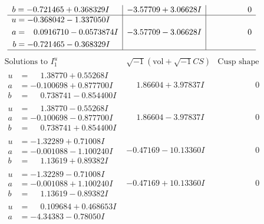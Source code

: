 \documentclass[1p]{elsarticle_modified}
\theoremstyle{definition}
\newcommand{\I}{\sqrt{-1}}
\begin{document}
$$\begin{array}{c|c|c}
\begin{aligned}
b &= -0.721465 + 0.368329 I\end{aligned}
 & -3.57709 + 3.06628 I & \phantom{-0.000000 } 0 \\ \hline\begin{aligned}
u &= -0.368042 - 1.337050 I \\
a &= \phantom{-}0.0916710 - 0.0573874 I \\
b &= -0.721465 - 0.368329 I\end{aligned}
 & -3.57709 - 3.06628 I & \phantom{-0.000000 } 0\\
 \hline 
 \end{array}$$\newpage$$\begin{array}{c|c|c}  
\text{Solutions to }I^u_{1}& \I (\text{vol} + \sqrt{-1}CS) & \text{Cusp shape}\\
 \hline 
\begin{aligned}
u &= \phantom{-}1.38770 + 0.55268 I \\
a &= -0.100698 + 0.877700 I \\
b &= \phantom{-}0.738741 - 0.854400 I\end{aligned}
 & \phantom{-}1.86604 + 3.97837 I & \phantom{-0.000000 } 0 \\ \hline\begin{aligned}
u &= \phantom{-}1.38770 - 0.55268 I \\
a &= -0.100698 - 0.877700 I \\
b &= \phantom{-}0.738741 + 0.854400 I\end{aligned}
 & \phantom{-}1.86604 - 3.97837 I & \phantom{-0.000000 } 0 \\ \hline\begin{aligned}
u &= -1.32289 + 0.71008 I \\
a &= -0.001088 - 1.100240 I \\
b &= \phantom{-}1.13619 + 0.89382 I\end{aligned}
 & -0.47169 - 10.13360 I & \phantom{-0.000000 } 0 \\ \hline\begin{aligned}
u &= -1.32289 - 0.71008 I \\
a &= -0.001088 + 1.100240 I \\
b &= \phantom{-}1.13619 - 0.89382 I\end{aligned}
 & -0.47169 + 10.13360 I & \phantom{-0.000000 } 0 \\ \hline\begin{aligned}
u &= \phantom{-}0.109684 + 0.468653 I \\
a &= -4.34383 - 0.78050 I \\

\end{aligned}
\end{array}$$
\end{document}
